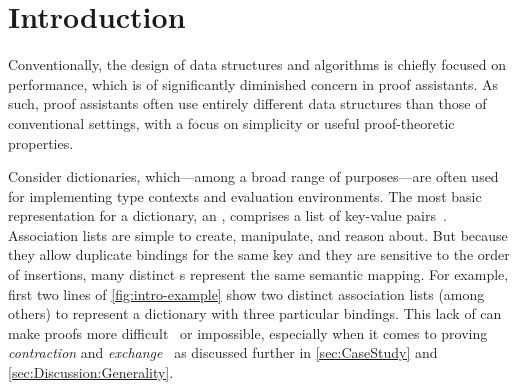 \section{Introduction}
\label{sec:Introduction}

\newcommand{\firstUseGoal}[1]
  {\textbf{\emph{#1}}}


Conventionally, the design of data structures and algorithms is chiefly focused on performance, which is of significantly diminished concern in proof assistants.
%
As such, proof assistants often use entirely different data structures than those of conventional settings, with a focus on simplicity or useful proof-theoretic properties.

Consider dictionaries, which---among a broad range of purposes---are often used for implementing type contexts and evaluation environments.
%
The most basic representation for a dictionary, an \emph{\sal}, comprises a list of key-value pairs~\citep[Lists]{Pierce:SF1}.
%
Association lists are simple to create, manipulate, and reason about.
%
But because they allow duplicate bindings for the same key and they are sensitive to the order of insertions, many distinct \sal{}s represent the same semantic mapping.
%
For example, first two lines of \autoref{fig:intro-example}
%
%
show two distinct association lists (among others) to represent a dictionary with three particular bindings.
%
This lack of \firstUseGoal{\Extensional} can make proofs more difficult~\cite[Maps]{Pierce:SF1} or impossible, especially when it comes to proving \emph{contraction} and \emph{exchange}~\citep{StructProp}
%
as discussed further in \autoref{sec:CaseStudy} and \autoref{sec:Discussion:Generality}.




